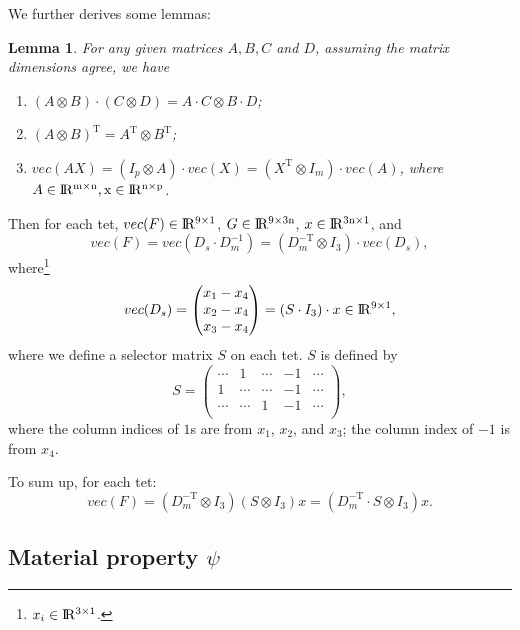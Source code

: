 \documentclass{fancydoc}
\newtheorem{lemma}{Lemma}
\newcommand{\trans}{\mathrm{T}}
\newcommand{\realR}{\rm I\!R}
\begin{document}
We further derives some lemmas:
\begin{lemma}
	For any given matrices $A, B, C$ and $D$, assuming the matrix dimensions agree, we have 
	\begin{enumerate}
		\item $(A \otimes B) \cdot (C \otimes D) = A \cdot C \otimes B \cdot D$;
		\item $(A \otimes B)^\trans  = A^\trans \otimes B^\trans$;
		\item $vec(AX) = (I_p \otimes A) \cdot vec(X) = (X^\trans \otimes I_m) \cdot vec(A)$, where $A \in \realR^{m \times n}, x \in \realR^{n \times p}$.
	\end{enumerate}
\end{lemma}
Then for each tet, $vec(F) \in \realR^{9 \times 1}$, $G \in \realR^{9 \times 3n}$, $x \in \realR^{3n \times 1}$, and
\begin{equation}
	vec(F)  = vec(D_s \cdot D_m^{-1}) = (D_m^{-\trans} \otimes I_3) \cdot vec(D_s),
\end{equation}
where\footnote{$x_i \in \realR^{3 \times 1}$. }
\begin{equation}
vec(D_s) = \begin{pmatrix}
x_1 - x_4 \\
x_2 - x_4 \\
x_3 - x_4
\end{pmatrix}  = (S \cdot I_3) \cdot x \in \realR^{9 \times 1}, 
\end{equation}
where we define a selector matrix $S$ on each tet. $S$ is defined by
\begin{equation}
	S = \begin{pmatrix}
	\cdots & 1 & \cdots & -1  & \cdots \\
	1 & \cdots  & \cdots  & -1 & \cdots \\
	  \cdots  &  \cdots & 1 & -1 & \cdots \\
	\end{pmatrix},
\end{equation}
where the column indices of $1$s are from $x_1$, $x_2$, and $x_3$; the column index of $-1$ is from $x_4$.

To sum up, for each tet:
\begin{equation}
vec(F) = (D_m^{-\trans} \otimes I_3) ( S \otimes I_3) x = (D_m^{-\trans} \cdot S \otimes I_3) x.
\end{equation}
\subsection{Material property $\psi$}
\end{document}
